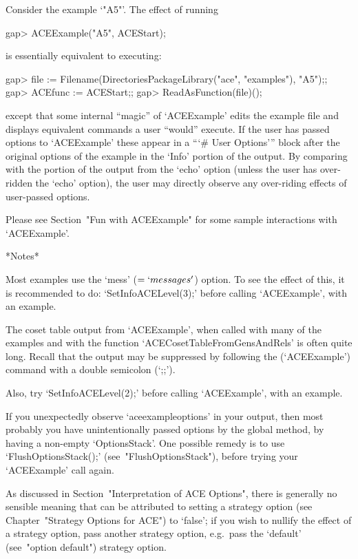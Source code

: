 Consider the example `"A5"'. The effect of running

\beginexample
gap> ACEExample("A5", ACEStart);
\endexample

is essentially equivalent to executing:

\beginexample
gap> file := Filename(DirectoriesPackageLibrary("ace", "examples"), "A5");;
gap> ACEfunc := ACEStart;;
gap> ReadAsFunction(file)();
\endexample

except that some internal ``magic'' of `ACEExample' edits the  example
file and displays equivalent commands a user ``would'' execute. If the
user  has  passed  options  to  `ACEExample'   these   appear   in   a
```\# User Options''' block after the original options of the  example
in the `Info' portion of the output. By comparing with the portion  of
the output from the `echo' option (unless the user has over-ridden the
`echo' option), the user may directly observe any over-riding  effects
of user-passed options.

Please see Section~"Fun with ACEExample" for some sample  interactions
with `ACEExample'.

*Notes*

Most examples use the `mess'  ($=  `messages'$)  option.  To  see  the
effect of this, it is recommended to do: `SetInfoACELevel(3);'  before
calling `ACEExample', with an example.

The coset table output from `ACEExample', when called with many of the
examples and with the {\ACE}  function  `ACECosetTableFromGensAndRels'
is often quite long. Recall that  the  output  may  be  suppressed  by
following the (`ACEExample') command with a double semicolon (`;;').

Also, try `SetInfoACELevel(2);' before  calling `ACEExample', with  an
example.

If you unexpectedly observe `aceexampleoptions' in your  output,  then
most probably you have unintentionally passed options  by  the  global
method, by having a non-empty `OptionsStack'. One possible  remedy  is
to use `FlushOptionsStack();' (see~"FlushOptionsStack"), before trying
your `ACEExample' call again.

As discussed in Section~"Interpretation  of  ACE  Options",  there  is
generally no sensible meaning that can  be  attributed  to  setting  a
strategy option (see Chapter~"Strategy Options for ACE")  to  `false';
if you wish to nullify the effect of a strategy option,  pass  another
strategy  option,  e.g.~pass  the  `default'  (see~"option   default")
strategy option.

